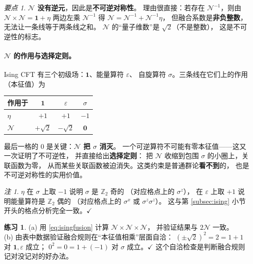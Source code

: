 \documentclass[UTF8,a4paper,11pt]{ctexart}
\theoremstyle{plain}
\theoremstyle{definition}
\newtheorem{exercise}{练习}[section]
\theoremstyle{remark}
\newtheorem{remark}{注}[section]
\newtheorem{keypoint}{要点}[section]
\newcommand{\ZZ}{\mathbb{Z}}
\begin{document}
\begin{keypoint}
\label{kp:noninvertible-first}
\textbf{$\mathcal N$ 没有逆元}，因此是\textbf{不可逆对称性}。
理由很直接：若存在 $\mathcal N^{-1}$，则由
$\mathcal N\times\mathcal N=\mathbf 1+\eta$ 两边左乘 $\mathcal N^{-1}$ 得
$\mathcal N=\mathcal N^{-1}+\mathcal N^{-1}\eta$，
但融合系数是\textbf{非负整数}，无法让一条线等于两条线之和。
$\mathcal N$ 的“量子维数”是 $\sqrt2$（不是整数），
这是不可逆性的标志。
\end{keypoint}

\paragraph{$\mathcal N$ 的作用与选择定则。}
Ising CFT 有三个初级场：$\mathbf 1$、能量算符 $\varepsilon$、
自旋算符 $\sigma$。三条线在它们上的作用（本征值）为
\begin{center}
\begin{tabular}{@{}lccc@{}}
\toprule
作用于 & $\mathbf 1$ & $\varepsilon$ & $\sigma$ \\
\midrule
$\eta$ & $+1$ & $+1$ & $-1$ \\
$\mathcal N$ & $+\sqrt2$ & $-\sqrt2$ & $\bm 0$ \\
\bottomrule
\end{tabular}
\end{center}
最后一格的 $0$ 是关键：\textbf{$\mathcal N$ 把 $\sigma$ 消灭}。
一个可逆算符不可能有零本征值——这又一次证明了不可逆性，
并直接给出\textbf{选择定则}：
把 $\mathcal N$ 收缩到包围 $\sigma$ 的小圈上，关联函数为零，
从而某些关联函数被迫消失。这类约束是普通群论\textbf{看不到}的，
也是不可逆对称性的实用价值。

\begin{remark}
$\eta$ 在 $\sigma$ 上取 $-1$ 说明 $\sigma$ 是 $\ZZ_2$ 奇的
（对应格点上的 $\sigma^z$），
在 $\varepsilon$ 上取 $+1$ 说明能量算符是 $\ZZ_2$ 偶的
（对应格点上的 $\sigma^x$ 或 $\sigma^z\sigma^z$）。
这与第 \ref{subsec:ising} 小节开头的格点分析完全一致。$\checkmark$
\end{remark}

\begin{exercise}
(a) 用 \eqref{eq:isingfusion} 计算 $\mathcal N\times\mathcal N\times\mathcal N$，
并验证结果与 $2\mathcal N$ 一致。\\
(b) 由表中数据验证融合规则在“本征值相乘”层面自洽：
$(\pm\sqrt2)^2=2=1+1$ 对 $\mathbf 1,\varepsilon$ 成立；
$0^2=0=1+(-1)$ 对 $\sigma$ 成立。$\checkmark$
这个自洽检查是判断融合规则记对没记对的好办法。
\end{exercise}
\end{document}
